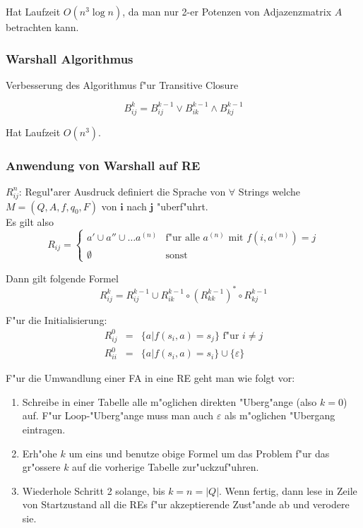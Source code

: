 \documentclass[german, 10pt, a4paper, twocolumn]{scrartcl}
\theoremstyle{definition}
\theoremstyle{example}
\begin{document}
Hat Laufzeit $O(n^3 \log n)$, da man nur 2-er Potenzen von Adjazenzmatrix $A$ betrachten kann.

\subsubsection{Warshall Algorithmus}

Verbesserung des Algorithmus f"ur Transitive Closure

\begin{displaymath}
	B_{ij}^k = B_{ij}^{k-1} \lor B_{ik}^{k-1} \land B_{kj}^{k-1}
\end{displaymath}

Hat Laufzeit $O(n^3)$.

\subsubsection{Anwendung von Warshall auf RE}

$R_{ij}^n$: Regul"arer Ausdruck definiert die Sprache von $\forall$ Strings welche $M=(Q,A, f, q_0, F)$ von $\mathbf{i}$ nach $\mathbf{j}$ "uberf"uhrt.\\

Es gilt also
\begin{displaymath}
	R_{ij} =
	\begin{cases}
		a'\cup a''\cup \ldots a^{(n)} &		\mbox{f"ur alle } a^{(n)} \mbox{ mit } f(i,a^{(n)})=j\\
		\emptyset &				\mbox{sonst}
	\end{cases}
\end{displaymath}


Dann gilt folgende Formel
\begin{displaymath}
	R_{ij}^k = R_{ij}^{k-1}\cup R_{ik}^{k-1}\circ(R_{kk}^{k-1})^*\circ R_{kj}^{k-1}
\end{displaymath}

F"ur die Initialisierung:
\begin{eqnarray*}
	R_{ij}^0 &	= &	\{ a | f(s_i, a) = s_j\} \text{ f"ur } i \neq j\\
	R_{ii}^0 &	= &	\{ a | f(s_i, a) = s_i\} \cup \{ \varepsilon\}
\end{eqnarray*}

F"ur die Umwandlung einer FA in eine RE geht man wie folgt vor:
\begin{enumerate}
	\item Schreibe in einer Tabelle alle m"oglichen direkten "Uberg"ange (also $k=0$) auf. F"ur Loop-"Uberg"ange muss man auch $\varepsilon$ als m"oglichen "Ubergang eintragen.
	\item Erh"ohe $k$ um eins und benutze obige Formel um das Problem f"ur das gr"ossere $k$ auf die vorherige Tabelle zur"uckzuf"uhren.
	\item Wiederhole Schritt 2 solange, bis $k=n = |Q|$. Wenn fertig, dann lese in Zeile von Startzustand all die REs f"ur akzeptierende Zust"ande ab und verodere sie.
\end{enumerate}
\ \\
\end{document}
